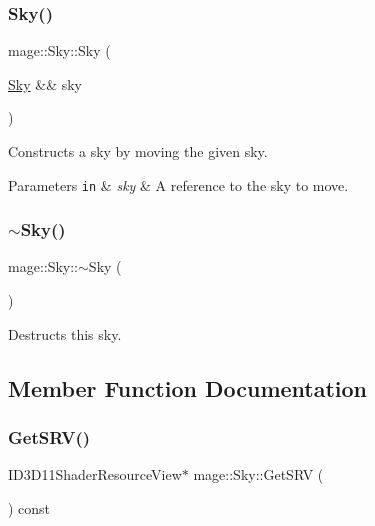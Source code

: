 \subsubsection{\texorpdfstring{Sky()}{Sky()}\hspace{0.1cm}{\footnotesize\ttfamily [3/3]}}
{\footnotesize\ttfamily mage\+::\+Sky\+::\+Sky (\begin{DoxyParamCaption}\item[{\hyperlink{classmage_1_1_sky}{Sky} \&\&}]{sky }\end{DoxyParamCaption})\hspace{0.3cm}{\ttfamily [default]}}

Constructs a sky by moving the given sky.


\begin{DoxyParams}[1]{Parameters}
\mbox{\tt in}  & {\em sky} & A reference to the sky to move. \\
\hline
\end{DoxyParams}
\hypertarget{classmage_1_1_sky_a42c605bd010c1c6576c3ecf32cd0e962}{}\label{classmage_1_1_sky_a42c605bd010c1c6576c3ecf32cd0e962} 
\subsubsection{\texorpdfstring{$\sim$\+Sky()}{~Sky()}}
{\footnotesize\ttfamily mage\+::\+Sky\+::$\sim$\+Sky (\begin{DoxyParamCaption}{ }\end{DoxyParamCaption})\hspace{0.3cm}{\ttfamily [default]}}

Destructs this sky. 

\subsection{Member Function Documentation}
\hypertarget{classmage_1_1_sky_ae72817d4b5015b985234183b6474f5d6}{}\label{classmage_1_1_sky_ae72817d4b5015b985234183b6474f5d6} 
\subsubsection{\texorpdfstring{Get\+S\+R\+V()}{GetSRV()}}
{\footnotesize\ttfamily I\+D3\+D11\+Shader\+Resource\+View$\ast$ mage\+::\+Sky\+::\+Get\+S\+RV (\begin{DoxyParamCaption}{ }\end{DoxyParamCaption}) const\hspace{0.3cm}{\ttfamily [noexcept]}}

